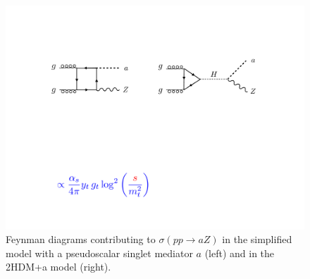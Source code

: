\begin{figure}
\centering
\includegraphics[width=.8\textwidth]{texinputs/02_model/figures/diagrams}
\caption{\label{fig:diagrams} Feynman diagrams contributing to $\sigma(pp \to a Z)$ in the simplified model with a pseudoscalar singlet mediator $a$ (left) and in the 2HDM+a model (right). }
\end{figure}
		

